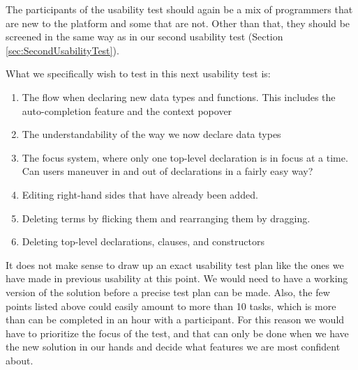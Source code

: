 The participants of the usability test should again be a mix of programmers
that are new to the platform and some that are not. Other than that, they
should be screened in the same way as in our second usability test (Section
\ref{sec:SecondUsabilityTest}).

What we specifically wish to test in this next usability test is:

\begin{enumerate}
	\item The flow when declaring new data types and functions. This includes the auto-completion feature and the context popover
	\item The understandability of the way we now declare data types
	\item The focus system, where only one top-level declaration is in focus at a
	time. Can users maneuver in and out of declarations in a fairly easy way?
	\item Editing right-hand sides that have already been added.
	\item Deleting terms by flicking them and rearranging them by dragging.
	\item Deleting top-level declarations, clauses, and constructors
\end{enumerate}

It does not make sense to draw up an exact usability test plan like the ones we have made in previous usability
at this point. We would need to have a working version of the solution before a precise test plan can be made. Also, the few points listed above could easily amount to more than 10 tasks, which is more than can be completed in an hour with a participant. For this reason we would have to prioritize the focus of the test, and that can only be done when we have the new solution in our hands and decide what features we are most confident about. 

















